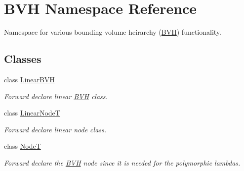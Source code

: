 \hypertarget{namespaceBVH}{}\section{B\+VH Namespace Reference}
\label{namespaceBVH}


Namespace for various bounding volume heirarchy (\hyperlink{namespaceBVH}{B\+VH}) functionality.  


\subsection*{Classes}
\begin{DoxyCompactItemize}
\item 
class \hyperlink{classBVH_1_1LinearBVH}{Linear\+B\+VH}
\begin{DoxyCompactList}\small\item\em Forward declare linear \hyperlink{namespaceBVH}{B\+VH} class. \end{DoxyCompactList}\item 
class \hyperlink{classBVH_1_1LinearNodeT}{Linear\+NodeT}
\begin{DoxyCompactList}\small\item\em Forward declare linear node class. \end{DoxyCompactList}\item 
class \hyperlink{classBVH_1_1NodeT}{NodeT}
\begin{DoxyCompactList}\small\item\em Forward declare the \hyperlink{namespaceBVH}{B\+VH} node since it is needed for the polymorphic lambdas. \end{DoxyCompactList}\end{DoxyCompactItemize}
